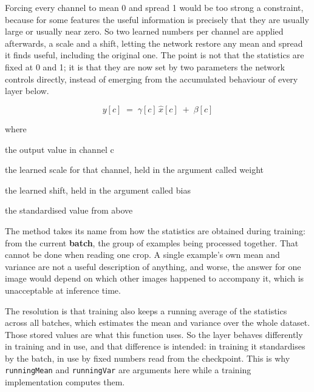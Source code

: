 Forcing every channel to mean 0 and spread 1 would be too strong a constraint, because for some features the useful information is precisely that they are usually large or usually near zero. So two learned numbers per channel are applied afterwards, a scale and a shift, letting the network restore any mean and spread it finds useful, including the original one. The point is not that the statistics are fixed at 0 and 1; it is that they are now set by two parameters the network controls directly, instead of emerging from the accumulated behaviour of every layer below.


\begin{equation}
y[c] \;=\; \gamma[c] \, \hat{x}[c] \;+\; \beta[c]
\end{equation}

\noindent where
\begin{description}[leftmargin=2.4em,style=nextline,font=\normalfont\ttfamily]\setlength\itemsep{1pt}
  \item[{$y[c]$}] \normalfont the output value in channel c
  \item[{$\gamma[c]$}] \normalfont the learned scale for that channel, held in the argument called weight
  \item[{$\beta[c]$}] \normalfont the learned shift, held in the argument called bias
  \item[{$\hat{x}[c]$}] \normalfont the standardised value from above
\end{description}

The method takes its name from how the statistics are obtained during training: from the current \textbf{batch}, the group of examples being processed together. That cannot be done when reading one crop. A single example's own mean and variance are not a useful description of anything, and worse, the answer for one image would depend on which other images happened to accompany it, which is unacceptable at inference time.

The resolution is that training also keeps a running average of the statistics across all batches, which estimates the mean and variance over the whole dataset. Those stored values are what this function uses. So the layer behaves differently in training and in use, and that difference is intended: in training it standardises by the batch, in use by fixed numbers read from the checkpoint. This is why \texttt{runningMean} and \texttt{runningVar} are arguments here while a training implementation computes them.


